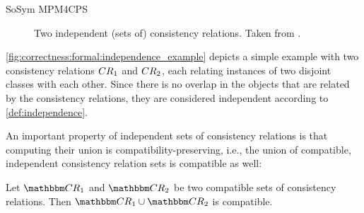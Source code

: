 \begin{copiedFrom}{SoSym MPM4CPS}
\begin{figure}
    \centering
    
    \caption[Two independent sets of consistency relations]{Two independent (sets of) consistency relations. Taken from .}
    \label{fig:correctness:formal:independence_example}
\end{figure}

\begin{example}
\autoref{fig:correctness:formal:independence_example} depicts a simple example with two consistency relations $CR_{1}$ and $CR_{2}$, each relating instances of two disjoint classes with each other.
Since there is no overlap in the objects that are related by the consistency relations, they are considered independent according to \autoref{def:independence}.
\end{example}

An important property of independent sets of consistency relations is that computing their union is compatibility-preserving, i.e., the union of compatible, independent consistency relation sets is compatible as well:

\begin{theorem} \label{theorem:independencecompatibility}
    Let $\consistencyrelationset{CR}_{1}$ and $\consistencyrelationset{CR}_{2}$ be two compatible sets of consistency relations. Then $\consistencyrelationset{CR}_{1} \cup \consistencyrelationset{CR}_{2}$ is compatible.
\end{theorem}


\end{copiedFrom}
